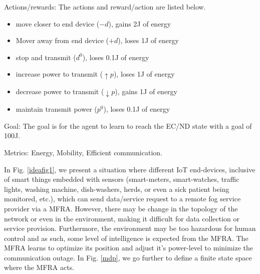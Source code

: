\documentclass[journal]{IEEEtran}
\begin{document}
 Actions/rewards: The actions and reward/action are listed below.

 \begin{itemize}
  \item move closer to end device ($-d$), gains 2J of energy
  \item Mover away from end device ($+d$), loses 1J of energy
  \item stop and transmit ($d^0$), loses 0.1J of energy
  \item increase power to transmit ($\uparrow p$), loses 1J of energy
  \item decrease power to transmit ($\downarrow p$), gains 1J of energy
  \item maintain transmit power ($p^0$), loses 0.1J of energy

\end{itemize}

Goal: The goal is for the agent to learn to reach the EC/ND state with a goal of 100J.

Metrics: Energy, Mobility, Efficient communication.


In Fig. \ref{ideafig1}, we present a situation where different IoT end-devices, inclusive of smart things embedded with sensors (smart-meters, smart-watches, traffic lights, washing machine, dish-washers, herds, or even a sick patient being monitored, etc.), which can send data/service request to a remote fog service provider via a MFRA. However, there may be change in the topology of the network or even in the environment, making it difficult for data collection or service provision. Furthermore, the environment may be too hazardous for human control and as such, some level of intelligence is expected from the MFRA. The MFRA learns to optimize its position and adjust it's power-level to minimize the communication outage. In Fig. \ref{mdp}, we go further to define a finite state space where the MFRA acts.
\end{document}
